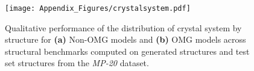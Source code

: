 \begin{figure}[th]
   \centering
   \texttt{[image: Appendix\_Figures/crystalsystem.pdf]}
   \caption{Qualitative performance of the distribution of crystal system by structure for \textbf{(a)} Non-OMG models and \textbf{(b)} OMG models across structural benchmarks computed on generated structures and test set structures from the \textit{MP-20} dataset.}
   \label{fig:viz_crystalsystem}
\end{figure}





